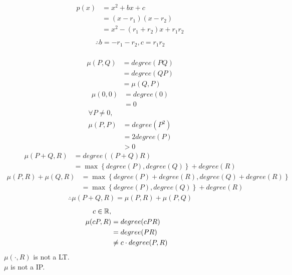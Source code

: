 \documentclass{mathtoolkit}
\begin{document}
\begin{p}
  \item
    \begin{align*}
      p(x) & = x^2 + bx +c \\
           & = (x - r_1) (x - r_2) \\
           & = x^2 - (r_1 + r_2) x + r_1 r_2 \\
    \end{align*}
    \begin{gather*}
      \therefore b = - r_1 - r_2, c = r_1 r_2 \\
    \end{gather*}

  \item
    \begin{align*}
      \mu(P, Q) & = degree(PQ) \\
                & = degree(QP) \\
                & = \mu(Q, P)
    \end{align*}
    \begin{align*}
      \mu(0, 0) & = degree(0) \\
                & = 0
    \end{align*}
    \begin{align*}
      \forall P \ne 0, \\
      \mu(P, P) & = degree(P^2) \\
                & = 2 degree(P) \\
                & > 0
    \end{align*}
    \begin{align*}
      \mu(P + Q, R) & = degree((P + Q) R) \\
                    & = \max \left\{ degree(P), degree(Q) \right\} + degree(R)
    \end{align*}
    \begin{align*}
      \mu(P, R) + \mu(Q, R) & = \max \left\{ degree(P) + degree(R), degree(Q) + degree(R) \right\} \\
                            & = \max \left\{ degree(P), degree(Q) \right\} + degree(R)
    \end{align*}
    \begin{gather*}
      \therefore \mu(P + Q, R) = \mu(P, R) + \mu(P, Q)
    \end{gather*}
    \begin{align*}
      c \in \mathbb{R}, \\
      \mu(cP, R) & = degree(cPR) \\
                 & = degree(PR) \\
                 & \ne c \cdot degree(P, R)
    \end{align*}
    \therefore $\mu(\cdot, R)$ is not a LT. \\
    \therefore $\mu$ is not a IP.


\end{p}
\end{document}
